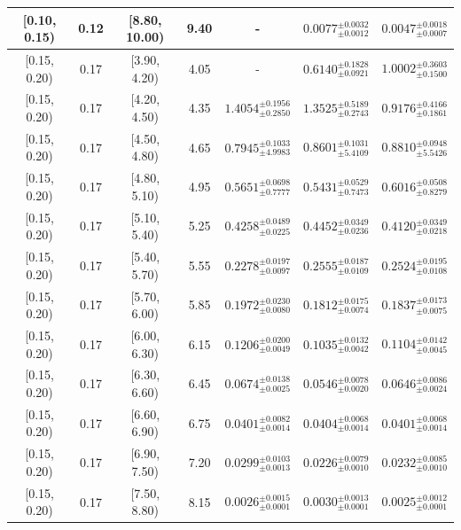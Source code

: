 \begin{longtable}{|c|c|c|c|c|c|c|}
\hline
[0.10, 0.15) & 0.12 & [8.80, 10.00) & 9.40 & - & $0.0077^{ \pm 0.0032 }_{ \pm 0.0012 }$ & $0.0047^{ \pm 0.0018 }_{ \pm 0.0007 }$ \\ 
\hline
[0.15, 0.20) & 0.17 & [3.90, 4.20) & 4.05 & - & $0.6140^{ \pm 0.1828 }_{ \pm 0.0921 }$ & $1.0002^{ \pm 0.3603 }_{ \pm 0.1500 }$ \\ 
\hline
[0.15, 0.20) & 0.17 & [4.20, 4.50) & 4.35 & $1.4054^{ \pm 0.1956 }_{ \pm 0.2850 }$ & $1.3525^{ \pm 0.5189 }_{ \pm 0.2743 }$ & $0.9176^{ \pm 0.4166 }_{ \pm 0.1861 }$ \\ 
\hline
[0.15, 0.20) & 0.17 & [4.50, 4.80) & 4.65 & $0.7945^{ \pm 0.1033 }_{ \pm 4.9983 }$ & $0.8601^{ \pm 0.1031 }_{ \pm 5.4109 }$ & $0.8810^{ \pm 0.0948 }_{ \pm 5.5426 }$ \\ 
\hline
[0.15, 0.20) & 0.17 & [4.80, 5.10) & 4.95 & $0.5651^{ \pm 0.0698 }_{ \pm 0.7777 }$ & $0.5431^{ \pm 0.0529 }_{ \pm 0.7473 }$ & $0.6016^{ \pm 0.0508 }_{ \pm 0.8279 }$ \\ 
\hline
[0.15, 0.20) & 0.17 & [5.10, 5.40) & 5.25 & $0.4258^{ \pm 0.0489 }_{ \pm 0.0225 }$ & $0.4452^{ \pm 0.0349 }_{ \pm 0.0236 }$ & $0.4120^{ \pm 0.0349 }_{ \pm 0.0218 }$ \\ 
\hline
[0.15, 0.20) & 0.17 & [5.40, 5.70) & 5.55 & $0.2278^{ \pm 0.0197 }_{ \pm 0.0097 }$ & $0.2555^{ \pm 0.0187 }_{ \pm 0.0109 }$ & $0.2524^{ \pm 0.0195 }_{ \pm 0.0108 }$ \\ 
\hline
[0.15, 0.20) & 0.17 & [5.70, 6.00) & 5.85 & $0.1972^{ \pm 0.0230 }_{ \pm 0.0080 }$ & $0.1812^{ \pm 0.0175 }_{ \pm 0.0074 }$ & $0.1837^{ \pm 0.0173 }_{ \pm 0.0075 }$ \\ 
\hline
[0.15, 0.20) & 0.17 & [6.00, 6.30) & 6.15 & $0.1206^{ \pm 0.0200 }_{ \pm 0.0049 }$ & $0.1035^{ \pm 0.0132 }_{ \pm 0.0042 }$ & $0.1104^{ \pm 0.0142 }_{ \pm 0.0045 }$ \\ 
\hline
[0.15, 0.20) & 0.17 & [6.30, 6.60) & 6.45 & $0.0674^{ \pm 0.0138 }_{ \pm 0.0025 }$ & $0.0546^{ \pm 0.0078 }_{ \pm 0.0020 }$ & $0.0646^{ \pm 0.0086 }_{ \pm 0.0024 }$ \\ 
\hline
[0.15, 0.20) & 0.17 & [6.60, 6.90) & 6.75 & $0.0401^{ \pm 0.0082 }_{ \pm 0.0014 }$ & $0.0404^{ \pm 0.0068 }_{ \pm 0.0014 }$ & $0.0401^{ \pm 0.0068 }_{ \pm 0.0014 }$ \\ 
\hline
[0.15, 0.20) & 0.17 & [6.90, 7.50) & 7.20 & $0.0299^{ \pm 0.0103 }_{ \pm 0.0013 }$ & $0.0226^{ \pm 0.0079 }_{ \pm 0.0010 }$ & $0.0232^{ \pm 0.0085 }_{ \pm 0.0010 }$ \\ 
\hline
[0.15, 0.20) & 0.17 & [7.50, 8.80) & 8.15 & $0.0026^{ \pm 0.0015 }_{ \pm 0.0001 }$ & $0.0030^{ \pm 0.0013 }_{ \pm 0.0001 }$ & $0.0025^{ \pm 0.0012 }_{ \pm 0.0001 }$ \\ 

\end{longtable}
